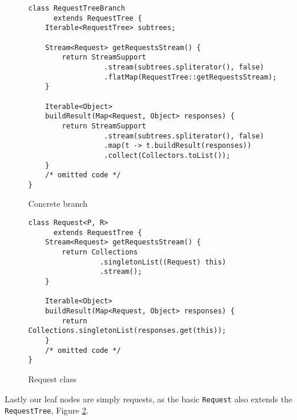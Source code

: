 \begin{figure}[h]

\begin{verbatim}
class RequestTreeBranch
      extends RequestTree {
    Iterable<RequestTree> subtrees;

    Stream<Request> getRequestsStream() {
        return StreamSupport
                  .stream(subtrees.spliterator(), false)
                  .flatMap(RequestTree::getRequestsStream);
    }

    Iterable<Object>
    buildResult(Map<Request, Object> responses) {
        return StreamSupport
                  .stream(subtrees.spliterator(), false)
                  .map(t -> t.buildResult(responses))
                  .collect(Collectors.toList());
    }
    /* omitted code */
}
\end{verbatim}
\caption{Concrete branch}
\label{fig:tree-impl-branch}

\end{figure}


\begin{figure}[h]

\begin{verbatim}
class Request<P, R>
      extends RequestTree {
    Stream<Request> getRequestsStream() {
        return Collections
                 .singletonList((Request) this)
                 .stream();
    }

    Iterable<Object>
    buildResult(Map<Request, Object> responses) {
        return Collections.singletonList(responses.get(this));
    }
    /* omitted code */
}
\end{verbatim}

\caption{Request class}
\label{fig:tree-impl-request-class}
\end{figure}

Lastly our leaf nodes are simply requests, as the basic \texttt{Request} also extends the \texttt{RequestTree}, Figure \ref{fig:tree-impl-request-class}.
